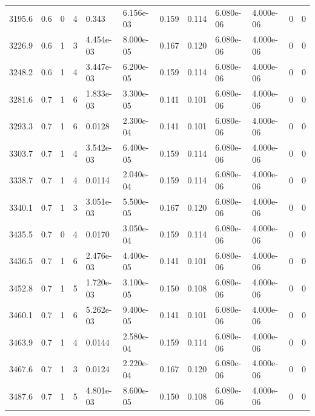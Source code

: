 \documentclass[preview]{standalone}
\begin{document}
{{{\begin{tabular}{L{1.2cm}C{1.2cm} C{0.3cm}C{0.5cm} C{1.4cm}C{1.4cm} C{1.4cm}C{1.4cm} C{1.6cm}C{1.6cm} C{1.6cm}C{1.6cm}}
  3195.6  &   0.6  & 0     &  4 &  0.343  & 6.156e-03  &  0.159&   0.114& 6.080e-06 & 4.000e-06   &  0 & 0  \\ 
  3226.9  &   0.6  & 1     &  3 &  4.454e-03  & 8.000e-05  &  0.167&   0.120& 6.080e-06 & 4.000e-06   &  0 & 0  \\ 
  3248.2  &   0.6  & 1     &  4 &  3.447e-03  & 6.200e-05  &  0.159&   0.114& 6.080e-06 & 4.000e-06   &  0 & 0  \\ 
  3281.6  &   0.7  & 1     &  6 &  1.833e-03  & 3.300e-05  &  0.141&   0.101& 6.080e-06 & 4.000e-06   &  0 & 0  \\ 
  3293.3  &   0.7  & 1     &  6 &  0.0128  & 2.300e-04  &  0.141&   0.101& 6.080e-06 & 4.000e-06   &  0 & 0  \\ 
  3303.7  &   0.7  & 1     &  4 &  3.542e-03  & 6.400e-05  &  0.159&   0.114& 6.080e-06 & 4.000e-06   &  0 & 0  \\ 
  3338.7  &   0.7  & 1     &  4 &  0.0114  & 2.040e-04  &  0.159&   0.114& 6.080e-06 & 4.000e-06   &  0 & 0  \\ 
  3340.1  &   0.7  & 1     &  3 &  3.051e-03  & 5.500e-05  &  0.167&   0.120& 6.080e-06 & 4.000e-06   &  0 & 0  \\ 
  3435.5  &   0.7  & 0     &  4 &  0.0170  & 3.050e-04  &  0.159&   0.114& 6.080e-06 & 4.000e-06   &  0 & 0  \\ 
  3436.5  &   0.7  & 1     &  6 &  2.476e-03  & 4.400e-05  &  0.141&   0.101& 6.080e-06 & 4.000e-06   &  0 & 0  \\ 
  3452.8  &   0.7  & 1     &  5 &  1.720e-03  & 3.100e-05  &  0.150&   0.108& 6.080e-06 & 4.000e-06   &  0 & 0  \\ 
  3460.1  &   0.7  & 1     &  6 &  5.262e-03  & 9.400e-05  &  0.141&   0.101& 6.080e-06 & 4.000e-06   &  0 & 0  \\ 
  3463.9  &   0.7  & 1     &  4 &  0.0144  & 2.580e-04  &  0.159&   0.114& 6.080e-06 & 4.000e-06   &  0 & 0  \\ 
  3467.6  &   0.7  & 1     &  3 &  0.0124  & 2.220e-04  &  0.167&   0.120& 6.080e-06 & 4.000e-06   &  0 & 0  \\ 
  3487.6  &   0.7  & 1     &  5 &  4.801e-03  & 8.600e-05  &  0.150&   0.108& 6.080e-06 & 4.000e-06   &  0 & 0  \\ 
\hline 
\end{tabular} 

}}}
\end{document}
